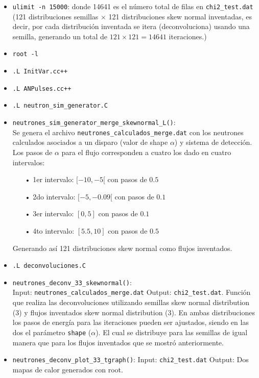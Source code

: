 \documentclass[11pt,letterpaper]{article}
\begin{document}
\begin{itemize}
\item \verb|ulimit -n 15000|: donde 14641  es el número total de filas en \verb|chi2_test.dat| (121 distribuciones semillas $\times$ 121 distribuciones skew normal inventadas, es decir, por cada distribución inventada se itera (deconvoluciona) usando una semilla, generando un total de $121 \times 121=14641$ iteraciones.)
\item \verb|root -l|
\item \verb|.L InitVar.cc++|
\item \verb|.L ANPulses.cc++|
\item \verb|.L neutron_sim_generator.C|
\item \verb|neutrones_sim_generator_merge_skewnormal_L()|: \\
Se genera el archivo \verb|neutrones_calculados_merge.dat| con los neutrones calculados asociados a un disparo (valor de shape $\alpha$) y sistema de detección. Los pasos de $\alpha$ para el flujo corresponden a cuatro los dado en cuatro intervalos:

\begin{itemize}
\item[•] 1er intervalo: $[-10,-5[$ con pasos de $0.5$
\item[•] 2do intervalo: $[-5,-0.09[$ con pasos de $0.1$
\item[•] 3er intervalo: $[0,5]$ con pasos de $0.1$
\item[•] 4to intervalo: $[5.5,10]$ con pasos de $0.5$
\end{itemize}

Generando así 121 distribuciones skew normal como flujos inventados.

\item \verb|.L deconvoluciones.C|
\item \verb|neutrones_deconv_33_skewnormal()|: \\
Input: \verb|neutrones_calculados_merge.dat| Output:  \verb|chi2_test.dat|.
Función que realiza las deconvoluciones utilizando semillas skew normal distribution (3) y flujos inventados skew normal distribution (3). En ambas distribuciones los pasos de energía para las iteraciones pueden ser ajustados, siendo en las dos el parámetro \verb|shape| ($\alpha$). El cual se distribuye para las semillas de igual manera que para los flujos inventados que se mostró anteriormente.

\item \verb|neutrones_deconv_plot_33_tgraph()|: Input: \verb|chi2_test.dat| Output: Dos mapas de calor generados con root.

\end{itemize}
\end{document}
